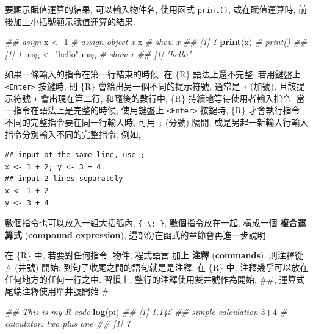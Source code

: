 \documentclass[
]{book}
\newenvironment{Shaded}{\begin{snugshade}}{\end{snugshade}}
\newcommand{\CommentTok}[1]{\textcolor[rgb]{0.56,0.35,0.01}{\textit{#1}}}
\newcommand{\DecValTok}[1]{\textcolor[rgb]{0.00,0.00,0.81}{#1}}
\newcommand{\KeywordTok}[1]{\textcolor[rgb]{0.13,0.29,0.53}{\textbf{#1}}}
\newcommand{\NormalTok}[1]{#1}
\newcommand{\OperatorTok}[1]{\textcolor[rgb]{0.81,0.36,0.00}{\textbf{#1}}}
\newcommand{\StringTok}[1]{\textcolor[rgb]{0.31,0.60,0.02}{#1}}
\begin{document}
要顯示賦值運算的結果,
可以輸入物件名,
使用函式 \texttt{print()},
或在賦值運算時, 前後加上小括號顯示賦值運算的結果.

\begin{Shaded}
\begin{Highlighting}[]
\CommentTok{\#\# asign          }
\NormalTok{x \textless{}{-}}\StringTok{ }\DecValTok{1}   \CommentTok{\# assign object x           }
\NormalTok{x        }\CommentTok{\# show x             }
\CommentTok{\#\# [1] 1}
\KeywordTok{print}\NormalTok{(x) }\CommentTok{\# print()                  }
\CommentTok{\#\# [1] 1}
\NormalTok{msg \textless{}{-}}\StringTok{ "hello"}                   
\NormalTok{msg     }\CommentTok{\# show x                     }
\CommentTok{\#\# [1] "hello"}
\end{Highlighting}
\end{Shaded}

如果一條輸入的指令在第一行結束的時候,
在 \{R\} 語法上還不完整,
若用鍵盤上 \texttt{\textless{}Enter\textgreater{}} 按鍵時,
則
\{R\} 會給出另一個不同的提示符號,
通常是 \texttt{+} (加號),
且該提示符號 \texttt{+} 會出現在第二行,
和隨後的數行中,
\{R\} 持續地等待使用者輸入指令.
當一指令在語法上是完整的時候,
使用鍵盤上 \texttt{\textless{}Enter\textgreater{}} 按鍵時,
\{R\} 才會執行指令.
不同的完整指令要在同一行輸入時,
可用 \texttt{;} (分號) 隔開, 或是另起一新輸入行輸入指令分別輸入不同的完整指令.
例如,

\begin{verbatim}
## input at the same line, use ;
x <- 1 + 2; y <- 3 + 4
## input 2 lines separately  
x <- 1 + 2
y <- 3 + 4
\end{verbatim}

數個指令也可以放入一組大括弧內,
\texttt{\{\ \textbackslash{};\ \}},
數個指令放在一起,
構成一個
\textbf{複合運算式}
(\textbf{compound expression}),
這部份在函式的章節會再進一步說明.

在 \{R\} 中, 若要對任何指令, 物件, 程式語言
加上
\textbf{注釋}
(\textbf{commands}),
則注釋從 \# (井號) 開始, 到句子收尾之間的語句就是是注釋,
在 \{R\} 中,
注釋幾乎可以放在任何地方的任何一行之中.
習慣上, 整行的注釋使用雙井號作為開始, \#\#,
運算式尾端注釋使用單井號開始 \#.

\begin{Shaded}
\begin{Highlighting}[]
\CommentTok{\#\# This is my R code}
\KeywordTok{log}\NormalTok{(pi)}
\CommentTok{\#\# [1] 1.145}
\CommentTok{\#\# simple calculation}
\DecValTok{3}\OperatorTok{+}\DecValTok{4} \CommentTok{\# calculator: two plus one}
\CommentTok{\#\# [1] 7}
\end{Highlighting}
\end{Shaded}
\end{document}
